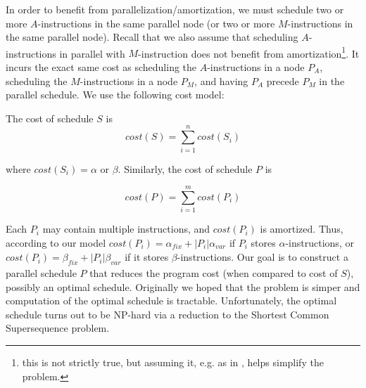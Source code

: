 In order to benefit from parallelization/amortization, we must schedule two or more $A$-instructions in the same parallel node (or two or more $M$-instructions in the same parallel node). Recall that we also assume that scheduling $A$-instructions in parallel with $M$-instruction does not benefit from amortization\footnote{this is not strictly true, but assuming it, e.g. as in \cite{Ishaq2019, Demmler2015ABYA, Mohassel2018}, helps simplify the problem.}. It incurs the exact same cost as scheduling the $A$-instructions in a node $P_A$, scheduling the $M$-instructions in a node $P_M$, and having $P_A$ precede $P_M$ in the parallel schedule. We use the following cost model:


The cost of schedule $S$ is
\begin{equation}
    \mathit{cost}(S) = \sum_{i=1}^n \mathit{cost}(S_i)
\end{equation}

where $cost(S_i) = \alpha$ or $\beta$. %
Similarly, the cost of schedule $P$ is

\begin{equation}\label{eq_par_schedule_cost}
    \mathit{cost}(P) = \sum_{i=1}^m \mathit{cost}(P_i)
\end{equation}

Each $P_i$ may contain multiple instructions, and $\mathit{cost}(P_i)$ is amortized.
Thus, according to our model $\mathit{cost}(P_i) = \alpha_\mathit{fix} + |P_i|\alpha_\mathit{var}$ if $P_i$ stores $\alpha$-instructions, 
or $\mathit{cost}(P_i) = \beta_\mathit{fix} + |P_i|\beta_\mathit{var}$ if it stores $\beta$-instructions.
Our goal is to construct a parallel schedule $P$ that reduces the program cost (when compared to cost of $S$), possibly an optimal schedule. 
Originally we hoped that the problem is simper and computation of the optimal schedule is tractable. Unfortunately, the optimal schedule turns out to be NP-hard via a reduction 
to the Shortest Common Supersequence problem.

